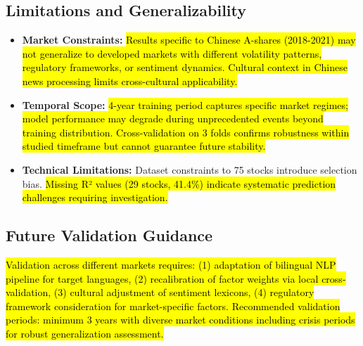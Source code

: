 \documentclass[3p,times,procedia]{elsarticle}
\begin{document}
\subsection{Limitations and Generalizability}
\vspace{-2pt}
\begin{itemize}\setlength{\itemsep}{1pt}
\item \textbf{Market Constraints:} \hl{Results specific to Chinese A-shares (2018-2021) may not generalize to developed markets with different volatility patterns, regulatory frameworks, or sentiment dynamics. Cultural context in Chinese news processing limits cross-cultural applicability.}

\item \textbf{Temporal Scope:} \hl{4-year training period captures specific market regimes; model performance may degrade during unprecedented events beyond training distribution. Cross-validation on 3 folds confirms robustness within studied timeframe but cannot guarantee future stability.}

\item \textbf{Technical Limitations:} Dataset constraints to 75 stocks introduce selection bias. \hl{Missing R² values (29 stocks, 41.4\%) indicate systematic prediction challenges requiring investigation.}
\end{itemize}

\subsection{Future Validation Guidance}
\vspace{-2pt}
\hl{Validation across different markets requires: (1) adaptation of bilingual NLP pipeline for target languages, (2) recalibration of factor weights via local cross-validation, (3) cultural adjustment of sentiment lexicons, (4) regulatory framework consideration for market-specific factors. Recommended validation periods: minimum 3 years with diverse market conditions including crisis periods for robust generalization assessment.} 



\end{document}
